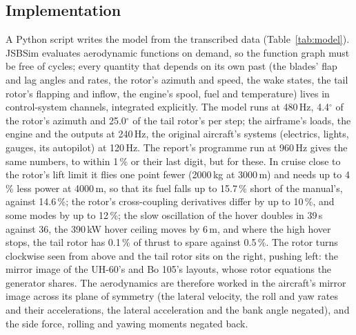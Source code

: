 \documentclass[10pt,a4paper,twocolumn]{article}
\newcommand{\Tab}[1]{}
\begin{document}
\subsection{Implementation}
A Python script writes the model from the transcribed data (Table~\ref{tab:model}). JSBSim evaluates aerodynamic functions on demand, so
the function graph must be free of cycles; every quantity that depends on its own past (the blades' flap and lag angles and rates, the
rotor's azimuth and speed, the wake states, the tail rotor's flapping and inflow, the engine's spool, fuel and temperature) lives in
control-system channels, integrated explicitly. The model runs at 480\,Hz, 4.4$^\circ$ of the rotor's azimuth and 25.0$^\circ$ of the tail rotor's per step; the airframe's loads,
the engine and the outputs at 240\,Hz, the original aircraft's systems (electrics, lights, gauges, its autopilot) at 120\,Hz. The
report's programme run at 960\,Hz gives the same numbers, to within 1\,\% or their last digit, but for these. In cruise close to the
rotor's lift limit it flies one point fewer (2000\,kg at 3000\,m) and needs up to 4\,\% less power at 4000\,m, so that its fuel falls
up to 15.7\,\% short of the manual's, against 14.6\,\%; the rotor's cross-coupling derivatives differ by up to 10\,\%, and some modes
by up to 12\,\%; the slow oscillation of the hover doubles in 39\,s against 36, the 390\,kW hover
ceiling moves by 6\,m, and where the high hover stops, the tail rotor has 0.1\,\% of thrust to spare against 0.5\,\%. The rotor turns clockwise seen from above and the tail rotor sits on the right, pushing left: the
mirror image of the UH-60's and Bo 105's layouts, whose rotor equations the generator shares. The aerodynamics are therefore worked in
the aircraft's mirror image across its plane of symmetry (the lateral velocity, the roll and yaw rates and their accelerations, the
lateral acceleration and the bank angle negated), and the side force, rolling and yawing moments negated back.

\begin{table}[t]
\centering\small
\caption{The generated model: JSBSim system files.}\label{tab:model}
\Tab{model}
\end{table}

\begin{table}[t]
\centering\small
\caption{Main data (TC type certificate, TD This Day in Aviation, TE engine certificate, SPEC the type specification and the
flight manual's charts in it, BO the Bo 105 rotor tests, E88 14th ERF, AC a blade, HL Hindustan Aeronautics' description, 3D the
FlightGear 3-D model).}\label{tab:params}
\Tab{params}
\end{table}
\end{document}
